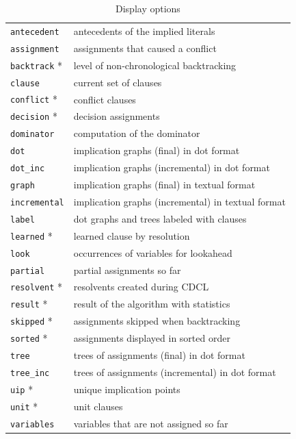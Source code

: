 \documentclass[11pt]{article}
\newcommand*{\p}[1]{\textup{\texttt{#1}}}
\begin{document}
\begin{table}
\begin{center}
\begin{tabular}{|l|l|}
\hline
\p{antecedent}  &  antecedents of the implied literals\\
\p{assignment}  &  assignments that caused a conflict\\
\p{backtrack} * &  level of non-chronological backtracking\\
\p{clause}      &  current set of clauses\\
\p{conflict} *  &  conflict clauses\\
\p{decision} *  &  decision assignments \\
\p{dominator}   &  computation of the dominator\\
\p{dot}         &  implication graphs (final) in dot format \\
\p{dot\_inc}    &  implication graphs (incremental) in dot format\\
\p{graph}       &  implication graphs (final) in textual format \\
\p{incremental} &  implication graphs (incremental) in textual format\\
\p{label}       &  dot graphs and trees labeled with clauses\\
\p{learned} *   &  learned clause by resolution\\
\p{look}        &  occurrences of variables for lookahead\\
\p{partial}     &  partial assignments so far \\
\p{resolvent} * &  resolvents created during CDCL \\
\p{result} *    &  result of the algorithm with statistics\\
\p{skipped} *   &  assignments skipped when backtracking \\
\p{sorted} *    &  assignments displayed in sorted order\\
\p{tree}        &  trees of assignments (final) in dot format\\
\p{tree\_inc}   &  trees of assignments (incremental) in dot format\\
\p{uip} *       &  unique implication points \\
\p{unit} *      &  unit clauses \\
\p{variables}   &  variables that are not assigned so far\\
\hline
\end{tabular}
\caption{Display options}\label{tab.display}
\end{center}
\end{table}
\end{document}
